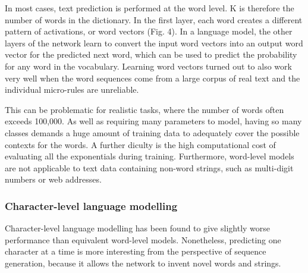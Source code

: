 In most cases, text prediction  is performed at the word level. K is therefore the number of words in the dictionary. \cite{graves2013generating}
In the first layer, each word creates a different pattern of activations, or word vectors (Fig. 4). In a language model, the other layers of the network learn to convert the input word vectors into an output word vector for the predicted next word, which can be used to predict the probability for any word in the vocabulary. Learning word vectors turned out to also work very well when the word sequences come from a large corpus of real text and the individual micro-rules are unreliable.\cite{lecun2015deep}

This can be problematic for realistic tasks, where the number of words often exceeds 100,000. As well as requiring many parameters to model, having so many classes demands a huge amount of training data to adequately cover the possible contexts for the words. A further diculty is the high computational cost of evaluating all the exponentials during training. Furthermore, word-level models are not applicable to text data containing non-word strings, such as multi-digit numbers or web addresses.\cite{graves2013generating}
\subsubsection{Character-level language modelling}

Character-level language modelling has been found to give slightly worse performance than equivalent word-level models. Nonetheless, predicting one character at a time is more interesting from the perspective of sequence generation, because it allows the network to invent novel words and strings.
\cite{graves2013generating}

